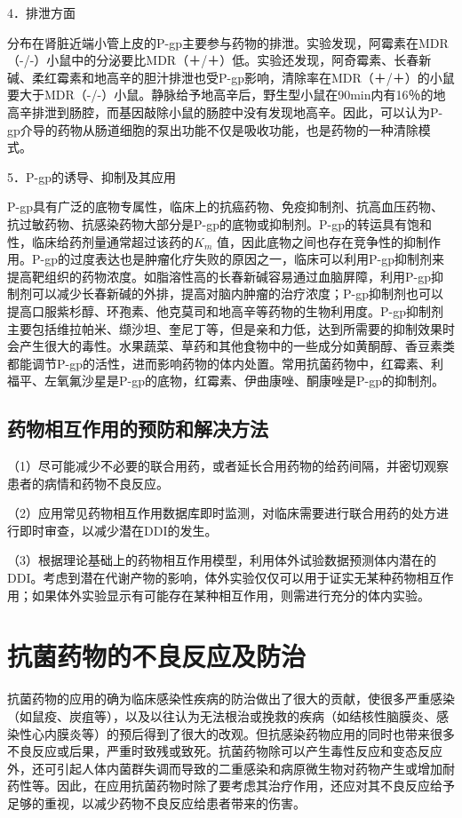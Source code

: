 4．排泄方面

分布在肾脏近端小管上皮的P-gp主要参与药物的排泄。实验发现，阿霉素在MDR（-/-）小鼠中的分泌要比MDR（＋/＋）低。实验还发现，阿奇霉素、长春新碱、柔红霉素和地高辛的胆汁排泄也受P-gp影响，清除率在MDR（＋/＋）的小鼠要大于MDR（-/-）小鼠。静脉给予地高辛后，野生型小鼠在90min内有16％的地高辛排泄到肠腔，而基因敲除小鼠的肠腔中没有发现地高辛。因此，可以认为P-gp介导的药物从肠道细胞的泵出功能不仅是吸收功能，也是药物的一种清除模式。

5．P-gp的诱导、抑制及其应用

P-gp具有广泛的底物专属性，临床上的抗癌药物、免疫抑制剂、抗高血压药物、抗过敏药物、抗感染药物大部分是P-gp的底物或抑制剂。P-gp的转运具有饱和性，临床给药剂量通常超过该药的$K_m$
值，因此底物之间也存在竞争性的抑制作用。P-gp的过度表达也是肿瘤化疗失败的原因之一，临床可以利用P-gp抑制剂来提高靶组织的药物浓度。如脂溶性高的长春新碱容易通过血脑屏障，利用P-gp抑制剂可以减少长春新碱的外排，提高对脑内肿瘤的治疗浓度；P-gp抑制剂也可以提高口服紫杉醇、环孢素、他克莫司和地高辛等药物的生物利用度。P-gp抑制剂主要包括维拉帕米、缬沙坦、奎尼丁等，但是亲和力低，达到所需要的抑制效果时会产生很大的毒性。水果蔬菜、草药和其他食物中的一些成分如黄酮醇、香豆素类都能调节P-gp的活性，进而影响药物的体内处置。常用抗菌药物中，红霉素、利福平、左氧氟沙星是P-gp的底物，红霉素、伊曲康唑、酮康唑是P-gp的抑制剂。

\subsection{药物相互作用的预防和解决方法}

（1）尽可能减少不必要的联合用药，或者延长合用药物的给药间隔，并密切观察患者的病情和药物不良反应。

（2）应用常见药物相互作用数据库即时监测，对临床需要进行联合用药的处方进行即时审查，以减少潜在DDI的发生。

（3）根据理论基础上的药物相互作用模型，利用体外试验数据预测体内潜在的DDI。考虑到潜在代谢产物的影响，体外实验仅仅可以用于证实无某种药物相互作用；如果体外实验显示有可能存在某种相互作用，则需进行充分的体内实验。

\section{抗菌药物的不良反应及防治}

抗菌药物的应用的确为临床感染性疾病的防治做出了很大的贡献，使很多严重感染（如鼠疫、炭疽等），以及以往认为无法根治或挽救的疾病（如结核性脑膜炎、感染性心内膜炎等）的预后得到了很大的改观。但抗感染药物应用的同时也带来很多不良反应或后果，严重时致残或致死。抗菌药物除可以产生毒性反应和变态反应外，还可引起人体内菌群失调而导致的二重感染和病原微生物对药物产生或增加耐药性等。因此，在应用抗菌药物时除了要考虑其治疗作用，还应对其不良反应给予足够的重视，以减少药物不良反应给患者带来的伤害。

